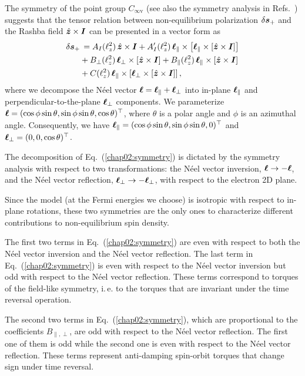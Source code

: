 The symmetry of the point group $C_{\infty\textrm{v}}$ (see also the symmetry analysis in Refs.~\cite{van_der_bijl_current-induced_2012, garello_symmetry_2013}) suggests that the tensor relation between non-equilibrium polarization $\delta\boldsymbol{s}_+$ and the Rashba field $\hat{\boldsymbol{z}}\times \boldsymbol{I}$ can be presented in a vector form as 
\begin{align}
\delta\boldsymbol{s}_+&\,= A_I(\ell_z^2)\,\hat{\boldsymbol{z}}\times \boldsymbol{I} + A'_I(\ell_z^2)\,\boldsymbol{\ell}_\parallel\times \left[\boldsymbol{\ell}_\parallel\times \left[\hat{\boldsymbol{z}}\times \boldsymbol{I}\right]\right]\nonumber\\
&+ B_\perp(\ell_z^2)\,\boldsymbol{\ell}_\perp\times \left[\hat{\boldsymbol{z}}\times \boldsymbol{I}\right]+B_\parallel(\ell_z^2)\,\boldsymbol{\ell}_\parallel\times \left[\hat{\boldsymbol{z}}\times \boldsymbol{I}\right]\nonumber\\
&+ C(\ell_z^2)\,\boldsymbol{\ell}_\parallel\times \left[\boldsymbol{\ell}_\perp\times \left[\hat{\boldsymbol{z}}\times \boldsymbol{I}\right]\right],
\label{chap02:symmetry}
\end{align}
where we decompose the N\'eel vector $\boldsymbol{\ell}=\boldsymbol{\ell}_\parallel+\boldsymbol{\ell}_\perp$ into in-plane $\boldsymbol{\ell}_\parallel$ and perpendicular-to-the-plane $\boldsymbol{\ell}_\perp$ components. We parameterize $\boldsymbol{\ell}=(\cos\phi\sin\theta,\sin\phi\sin\theta,\cos\theta)^\top$, where $\theta$ is a polar angle and $\phi$ is an azimuthal angle. Consequently, we have $\boldsymbol{\ell}_\parallel=(\cos\phi\sin\theta,\sin\phi\sin\theta,0)^\top$ and $\boldsymbol{\ell}_\perp=(0,0,\cos\theta)^\top$.

The decomposition of Eq.~(\ref{chap02:symmetry}) is dictated by the symmetry analysis with respect to two transformations: the N\'eel vector inversion, $\boldsymbol{\ell}\to -\boldsymbol{\ell}$, and the N\'eel vector reflection, $\boldsymbol{\ell}_\perp\to -\boldsymbol{\ell}_\perp$, with respect to the electron 2D plane. 

Since the model (at the Fermi energies we choose) is isotropic with respect to in-plane rotations, these two symmetries are the only ones to characterize different contributions to non-equilibrium spin density. 

The first two terms in Eq.~(\ref{chap02:symmetry}) are even with respect to both the N\'eel vector inversion and the N\'eel vector reflection. The last term in Eq.~(\ref{chap02:symmetry}) is even with respect to the N\'eel vector inversion but odd with respect to the N\'eel vector reflection. These terms correspond to torques of the field-like symmetry, i.\,e. to the torques that are invariant under the time reversal operation. 

The second two terms in Eq.~(\ref{chap02:symmetry}), which are proportional to the coefficients $B_{\parallel,\perp}$, are odd with respect to the N\'eel vector reflection. The first one of them is odd while the second one is even with respect to the N\'eel vector reflection. These terms represent anti-damping spin-orbit torques that change sign under time reversal.

